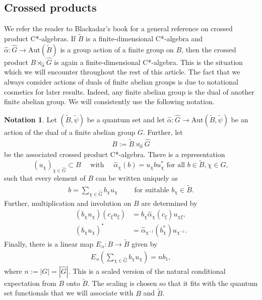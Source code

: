 \documentclass{amsart}
\theoremstyle{definition}
\newtheorem{notation}[thm]{Notation}
\theoremstyle{definition}
\begin{document}
\subsection{Crossed products}

We refer the reader to Blackadar's book \cite{blackadar_operator_2006} for a general reference on crossed product C*-algebras. If $\tilde{B}$ is a finite-dimensional C*-algebra and $\hat{\alpha}: \hat{G} \to \mathrm{Aut}(\tilde{B})$ is a group action of a finite group on $B$, then the crossed product $B \rtimes_{\hat{\alpha}} \hat{G}$ is again a finite-dimensional C*-algebra. This is the situation which we will encounter throughout the rest of this article. The fact that we always consider actions of duals of finite abelian groups is due to notational cosmetics for later results. Indeed, any finite abelian group is the dual of another finite abelian group.
We will consistently use the following notation.

\begin{notation}
    \label{pre::notation:crossed_product}
    Let $(\tilde{B}, \tilde{\psi})$ be a quantum set and let $\hat{\alpha}: \hat{G} \to \mathrm{Aut}(\tilde{B}, \tilde{\psi})$ be an action of the dual of a finite abelian group $G$. Further, let
    \begin{align*}
        B := \tilde{B} \rtimes_{\hat{\alpha}} \hat{G}
    \end{align*}
    be the associated crossed product C*-algebra. There is a representation 
    $$
    (u_\chi)_{\chi \in \hat{G}} \subset B
    \quad \text{ with } \quad
    \hat{\alpha}_\chi(b) = u_\chi b u_\chi^\ast
    \text{ for all } b \in \tilde{B}, \chi \in \hat{G},
    $$ 
    such that every element of $B$ can be written uniquely as
    \begin{align*}
        b = \sum_{\chi \in \hat{G}} b_\chi u_\chi
        \qquad \text{ for suitable } b_\chi \in \tilde{B}.
    \end{align*}
    Further, multiplication and involution on $B$ are determined by
    \begin{align*}
        (b_\chi u_\chi) (c_\xi u_\xi) &= b_\chi \hat{\alpha}_\chi(c_\xi) u_{\chi \xi}, \\
        (b_\chi u_\chi)^\ast &= \hat{\alpha}_{\chi^{-1}}(b_\chi^\ast) u_{\chi^{-1}}.
    \end{align*}
    Finally, there is a linear map $E_\rtimes: B \to \tilde{B}$ given by
    \begin{align*}
        E_\rtimes\left( \sum_{\chi \in \hat{G}} b_\chi u_\chi \right) = n b_1,
    \end{align*}
    where $n := |G| = |\hat{G}|$. This is a scaled version of the natural conditional expectation from $B$ onto $\tilde{B}$. The scaling is chosen so that it fits with the quantum set functionals that we will associate with $B$ and $\tilde{B}$.
\end{notation}
\end{document}
